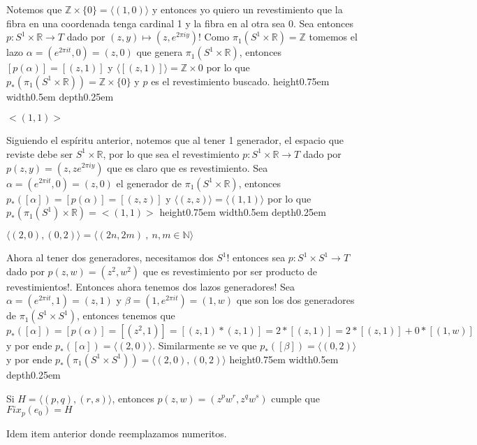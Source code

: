 \documentclass[11pt]{article}
\newcommand{\R}{{\mathbb{R}}}
\newcommand{\N}{{\mathbb{N}}}
\newcommand{\sett}[1]{\{#1\}}
\newenvironment{proof}[1][Demostraci\'on]{\begin{trivlist}
\item[\hskip \labelsep {\bfseries #1}]}{\end{trivlist}}
\newenvironment{declaration}[1][Afirmaci\'on]{\begin{trivlist}
\item[\hskip \labelsep {\bfseries #1}]}{\end{trivlist}}
\newcommand{\qed}{\nobreak \ifvmode \relax \else
      \ifdim\lastskip<1.5em \hskip-\lastskip
      \hskip1.5em plus0em minus0.5em \fi \nobreak
      \vrule height0.75em width0.5em depth0.25em\fi}
\newcommand{\Z}{\mathbb{Z}}
\begin{document}
\begin{enumerate}
\begin{proof}
\begin{enumerate}
Notemos que $\Z \times \sett{0} = \langle (1,0) \rangle$ y entonces yo quiero un revestimiento que la fibra en una coordenada tenga cardinal 1 y la fibra en al otra sea 0. Sea entonces $p : S^1 \times \R \rightarrow T$ dado por $(z,y) \mapsto (z, e^{2 \pi i y})$! 
Como $\pi_1(S^1 \times \R) = \Z$ tomemos el lazo 
$\alpha=(e^{2 \pi i t},0)=(z,0)$ que genera $\pi_1(S^1 \times \R)$, entonces $[p(\alpha)]=[(z,1)]$ y $\langle [(z,1)] \rangle = \Z \times 0 $ por lo que $p_*(\pi_1(S^1 \times \R)) = \Z \times \sett{0}$ y $p$ es el revestimiento buscado. \qed

\item {$<(1,1)>$}

Siguiendo el esp\'iritu anterior, notemos que al tener 1 generador, el espacio que reviste debe ser $S^1 \times \R$, por lo que sea el revestimiento $p: S^1 \times \R \rightarrow T$ dado por $p(z,y)=(z,ze^{2 \pi i y})$ que es claro que es revestimiento. Sea $\alpha=(e^{2 \pi i t},0)=(z,0)$ el generador de $\pi_1(S^1 \times \R)$, entonces $p_*([\alpha])=[p(\alpha)]=[(z,z)]$ y $\langle (z,z) \rangle = \langle (1,1) \rangle$ por lo que $p_*(\pi_1(S^1) \times \R) = <(1,1)>$ \qed

\item {$\langle (2,0) , (0,2) \rangle = \langle (2n,2m) \ , \ n,m \in \N \rangle$}

Ahora al tener dos generadores, necesitamos dos $S^1$! entonces sea $p: S^1 \times S^1 \rightarrow T$ dado por $p(z,w)=(z^2,w^2)$ que es revestimiento por ser producto de revestimientos!. Entonces ahora tenemos dos lazos generadores! Sea $\alpha=(e^{2 \pi i t},1)=(z,1)$ y $\beta=(1,e^{2 \pi i t})=(1,w)$ que son los dos generadores de $\pi_1(S^1 \times S^1)$, entonces tenemos que $p_*([\alpha]) = [p(\alpha)]=[(z^2,1)]=[(z,1)*(z,1)]=2*[(z,1)]= 2*[(z,1)]+0*[(1,w)]$ y por ende $p_*([\alpha])= \langle (2,0) \rangle$. Similarmente se ve que $p_*([\beta])=\langle (0,2) \rangle$ y por ende $p_*(\pi_1(S^1 \times S^1))=\langle (2,0) , (0,2) \rangle $ \qed

\begin{declaration}
Si $H= \langle (p,q), (r,s) \rangle$, entonces $p(z,w)=(z^p w^r, z^q w^s)$ cumple que $Fix_p(e_0)=H$
\end{declaration}

\begin{proof}
Idem item anterior donde reemplazamos numeritos.
\end{proof}

\end{enumerate}


\end{proof}
\end{enumerate}
\end{document}
